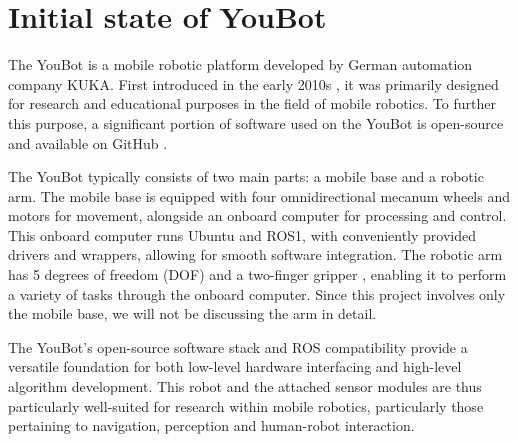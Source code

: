 \documentclass[a4paper, 12pt]{article}
\newif\ifshownotes
\newcommand{\notes}[1]{\ifshownotes\textcolor{blue}{#1}\fi}
\begin{document}
    \pagebreak

    \section{Initial state of YouBot}

    \notes{Section 2 done. draft \#1}

    The YouBot is a mobile robotic platform developed by German automation company KUKA. First introduced in the early 2010s \notes{[cite]}, it was primarily designed for research and educational purposes in the field of mobile robotics. To further this purpose, a significant portion of software used on the YouBot is open-source and available on GitHub \notes{[cite]}.

    The YouBot typically consists of two main parts: a mobile base and a robotic arm. The mobile base is equipped with four omnidirectional mecanum wheels and motors for movement, alongside an onboard computer for processing and control. This onboard computer runs Ubuntu and ROS1, with conveniently provided drivers and wrappers, allowing for smooth software integration. The robotic arm has 5 degrees of freedom (DOF) and a two-finger gripper \notes{[cite]}, enabling it to perform a variety of tasks through the onboard computer. Since this project involves only the mobile base, we will not be discussing the arm in detail.

    The YouBot's open-source software stack and ROS compatibility provide a versatile foundation for both low-level hardware interfacing and high-level algorithm development. This robot and the attached sensor modules are thus particularly well-suited for research within mobile robotics, particularly those pertaining to navigation, perception and human-robot interaction. 
\end{document}
